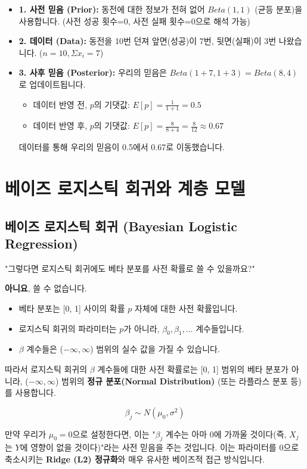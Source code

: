 \documentclass[11pt,a4paper]{book}
\theoremstyle{definition}
\begin{document}
\begin{examplebox}[title=베이즈 추론 예시]
\begin{itemize}
    \item \textbf{1. 사전 믿음 (Prior):}
    동전에 대한 정보가 전혀 없어 $Beta(1, 1)$ (균등 분포)을 사용합니다.
    (사전 성공 횟수=0, 사전 실패 횟수=0으로 해석 가능)
    
    \item \textbf{2. 데이터 (Data):}
    동전을 10번 던져 앞면(성공)이 7번, 뒷면(실패)이 3번 나왔습니다.
    ($n=10, \Sigma x_i = 7$)
    
    \item \textbf{3. 사후 믿음 (Posterior):}
    우리의 믿음은 $Beta(1+7, 1+3) = Beta(8, 4)$로 업데이트됩니다.
    \begin{itemize}
        \item 데이터 반영 전, $p$의 기댓값: $E[p] = \frac{1}{1+1} = 0.5$
        \item 데이터 반영 후, $p$의 기댓값: $E[p] = \frac{8}{8+4} = \frac{8}{12} \approx 0.67$
    \end{itemize}
    데이터를 통해 우리의 믿음이 0.5에서 0.67로 이동했습니다.
\end{itemize}
\end{examplebox}


\section{베이즈 로지스틱 회귀와 계층 모델}

\subsection{베이즈 로지스틱 회귀 (Bayesian Logistic Regression)}

"그렇다면 로지스틱 회귀에도 베타 분포를 사전 확률로 쓸 수 있을까요?"

\begin{warningbox}[title=NOPE!]
\textbf{아니요}, 쓸 수 없습니다.
\begin{itemize}
    \item 베타 분포는 [0, 1] 사이의 확률 $p$ 자체에 대한 사전 확률입니다.
    \item 로지스틱 회귀의 파라미터는 $p$가 아니라, $\beta_0, \beta_1, \dots$ 계수들입니다.
    \item $\beta$ 계수들은 ($-\infty, \infty$) 범위의 실수 값을 가질 수 있습니다.
\end{itemize}
따라서 로지스틱 회귀의 $\beta$ 계수들에 대한 사전 확률로는 [0, 1] 범위의 베타 분포가 아니라, ($-\infty, \infty$) 범위의 \textbf{정규 분포(Normal Distribution)} (또는 라플라스 분포 등)를 사용합니다.

$$ \beta_j \sim N(\mu_0, \sigma^2) $$

만약 우리가 $\mu_0 = 0$으로 설정한다면, 이는 "$\beta_j$ 계수는 아마 0에 가까울 것이다(즉, $X_j$는 $Y$에 영향이 없을 것이다)"라는 사전 믿음을 주는 것입니다.
이는 파라미터를 0으로 축소시키는 \textbf{Ridge (L2) 정규화}와 매우 유사한 베이즈적 접근 방식입니다.
\end{warningbox}
\end{document}
